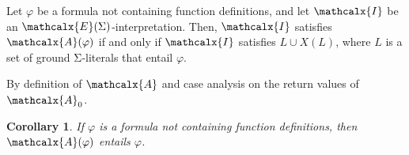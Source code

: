 \documentclass[runningheads,a4paper]{llncs}
\let\oldSigma=\Sigma
\def\Sigma{\mathrm{\oldSigma}}
\newcommand{\I}{\mathcalx{I}}
\newcommand{\conv}{\mathcalx{A}}
\newcommand{\extendsig}[1]{\mathcalx{E}( #1 )}
\newcommand{\absconstraints}{X}
\newtheorem{cor}{Corollary}
\begin{document}
\begin{lemma}\label{lem:conv}
Let $\varphi$ be a formula not containing function definitions,
and let $\I$ be an $\extendsig{\Sigma}$-interpretation.
Then, $\I$ satisfies $\conv( \varphi )$ if and only if
$\I$ satisfies $L \cup \absconstraints( L )$, where $L$ is a set of ground $\Sigma$-literals that entail $\varphi$.
\end{lemma}
\begin{proofsketch}
By definition of $\conv$ and case analysis on the return values of $\conv_0$.
\end{proofsketch}

\begin{cor}\label{cor:conv}
If $\varphi$ is a formula not containing function definitions, then $\conv( \varphi )$ entails $\varphi$.
\end{cor}
\end{document}
